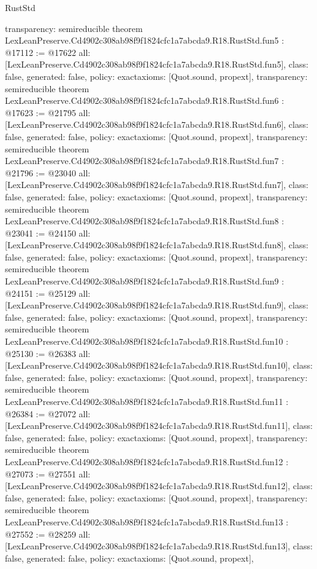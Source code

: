 \begin{lexlean}{RustStd}
\begin{coremodule}
{  transparency: semireducible
}
theorem LexLeanPreserve.Cd4902c308ab98f9f1824cfc1a7abcda9.R18.RustStd.fun5 : @17112 := @17622 {
  all: [LexLeanPreserve.Cd4902c308ab98f9f1824cfc1a7abcda9.R18.RustStd.fun5],
  class: false,
  generated: false,
  policy: exact{axioms: [Quot.sound, propext]},
  transparency: semireducible
}
theorem LexLeanPreserve.Cd4902c308ab98f9f1824cfc1a7abcda9.R18.RustStd.fun6 : @17623 := @21795 {
  all: [LexLeanPreserve.Cd4902c308ab98f9f1824cfc1a7abcda9.R18.RustStd.fun6],
  class: false,
  generated: false,
  policy: exact{axioms: [Quot.sound, propext]},
  transparency: semireducible
}
theorem LexLeanPreserve.Cd4902c308ab98f9f1824cfc1a7abcda9.R18.RustStd.fun7 : @21796 := @23040 {
  all: [LexLeanPreserve.Cd4902c308ab98f9f1824cfc1a7abcda9.R18.RustStd.fun7],
  class: false,
  generated: false,
  policy: exact{axioms: [Quot.sound, propext]},
  transparency: semireducible
}
theorem LexLeanPreserve.Cd4902c308ab98f9f1824cfc1a7abcda9.R18.RustStd.fun8 : @23041 := @24150 {
  all: [LexLeanPreserve.Cd4902c308ab98f9f1824cfc1a7abcda9.R18.RustStd.fun8],
  class: false,
  generated: false,
  policy: exact{axioms: [Quot.sound, propext]},
  transparency: semireducible
}
theorem LexLeanPreserve.Cd4902c308ab98f9f1824cfc1a7abcda9.R18.RustStd.fun9 : @24151 := @25129 {
  all: [LexLeanPreserve.Cd4902c308ab98f9f1824cfc1a7abcda9.R18.RustStd.fun9],
  class: false,
  generated: false,
  policy: exact{axioms: [Quot.sound, propext]},
  transparency: semireducible
}
theorem LexLeanPreserve.Cd4902c308ab98f9f1824cfc1a7abcda9.R18.RustStd.fun10 : @25130 := @26383 {
  all: [LexLeanPreserve.Cd4902c308ab98f9f1824cfc1a7abcda9.R18.RustStd.fun10],
  class: false,
  generated: false,
  policy: exact{axioms: [Quot.sound, propext]},
  transparency: semireducible
}
theorem LexLeanPreserve.Cd4902c308ab98f9f1824cfc1a7abcda9.R18.RustStd.fun11 : @26384 := @27072 {
  all: [LexLeanPreserve.Cd4902c308ab98f9f1824cfc1a7abcda9.R18.RustStd.fun11],
  class: false,
  generated: false,
  policy: exact{axioms: [Quot.sound, propext]},
  transparency: semireducible
}
theorem LexLeanPreserve.Cd4902c308ab98f9f1824cfc1a7abcda9.R18.RustStd.fun12 : @27073 := @27551 {
  all: [LexLeanPreserve.Cd4902c308ab98f9f1824cfc1a7abcda9.R18.RustStd.fun12],
  class: false,
  generated: false,
  policy: exact{axioms: [Quot.sound, propext]},
  transparency: semireducible
}
theorem LexLeanPreserve.Cd4902c308ab98f9f1824cfc1a7abcda9.R18.RustStd.fun13 : @27552 := @28259 {
  all: [LexLeanPreserve.Cd4902c308ab98f9f1824cfc1a7abcda9.R18.RustStd.fun13],
  class: false,
  generated: false,
  policy: exact{axioms: [Quot.sound, propext]},
}
\end{coremodule}
\end{lexlean}
